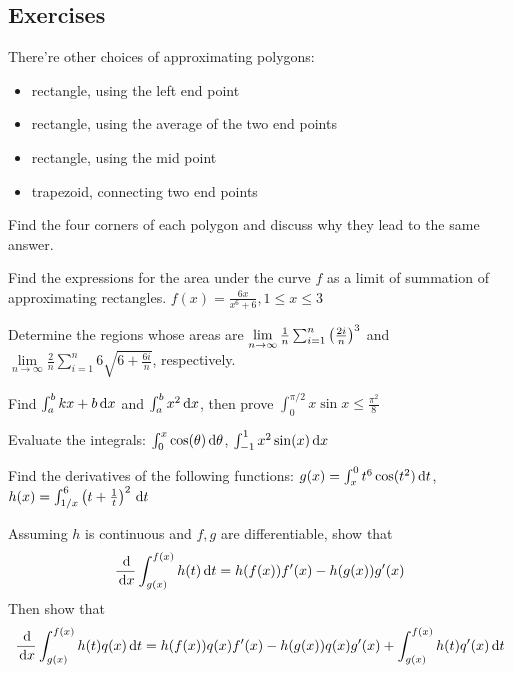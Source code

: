 \documentclass[Calculus 1 Recitation.tex]{subfiles}
\begin{document}
\subsection{Exercises}
\begin{myleftlinebox}
	There're other choices of approximating polygons:
	\begin{itemize}
		\item rectangle, using the left end point
		\item rectangle, using the average of the two end points
		\item rectangle, using the mid point
		\item trapezoid, connecting two end points
	\end{itemize}
	Find the four corners of each polygon and discuss why they lead to the same answer.
	\tcblower
	\vspace{2em}
\end{myleftlinebox}

\begin{myleftlinebox}
	Find the expressions for the area under the curve $f$ as a limit of summation of approximating rectangles. $f(x)=\frac{6x}{x^6+6}, 1\leq x\leq 3$
	\tcblower
	\vspace{2em}
\end{myleftlinebox}

\begin{myleftlinebox}
	Determine the regions whose areas are $\lim\limits_{n\to\infty} \frac{1}{n}\sum_{i=1}^n \left( \frac{2i}{n} \right)^3$ and $\lim\limits_{n\to\infty} \frac{2}{n}\sum_{i=1}^n 6\sqrt{6+\frac{6i}{n}}$, respectively.
	\tcblower
	\vspace{2em}
\end{myleftlinebox}

\begin{myleftlinebox}
	Find $\int_a^b kx+b\,\mathrm{d} x$ and $\int_a^b x^2\,\mathrm{d} x$, then prove $\int_0^{\pi/2} x\sin x\leq \frac{\pi^2}{8}$
	\tcblower
	\vspace{2em}
\end{myleftlinebox}

\begin{myleftlinebox}
	Evaluate the integrals: $\int_{0}^{x}\cos(\theta)\,\mathrm{d} \theta$, $\int_{-1}^1 x^2\sin(x) \,\mathrm{d} x$
	\tcblower
	\vspace{2em}
\end{myleftlinebox}

\begin{myleftlinebox}
	Find the derivatives of the following functions: $g(x)=\int_x^0 t^6\cos(t^2)\,\mathrm{d} t$, $h(x)=\int_{1/x}^6 \left( t+\frac{1}{t} \right)^2\,\mathrm{d} t$
	\tcblower
	\vspace{2em}
\end{myleftlinebox}

\begin{myleftlinebox}
	Assuming $h$ is continuous and $f,g$ are differentiable, show that
	\[\frac{\,\mathrm{d}}{\,\mathrm{d} x} \int_{g(x)}^{f(x)} h(t)\,\mathrm{d} t = h(f(x))f'(x)-h(g(x))g'(x)\]
	Then show that
	\[\frac{\,\mathrm{d}}{\,\mathrm{d} x} \int_{g(x)}^{f(x)} h(t)q(x)\,\mathrm{d} t = h(f(x))q(x)f'(x)-h(g(x))q(x)g'(x)+\int_{g(x)}^{f(x)} h(t)q'(x)\,\mathrm{d} t\]
	\tcblower
	\vspace{2em}
\end{myleftlinebox}
\end{document}
